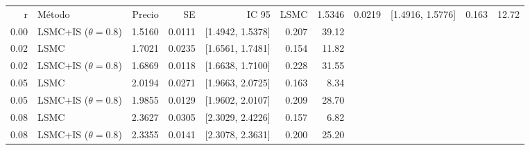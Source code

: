 \begin{tabular}{r p{3.6cm} r r r r r}
\toprule
r & Método & Precio & SE & IC 95%
 & LSMC & 1.5346 & 0.0219 & [1.4916, 1.5776] & 0.163 & 12.72 \\
0.00 & LSMC+IS ($\theta=0.8$) & 1.5160 & 0.0111 & [1.4942, 1.5378] & 0.207 & 39.12 \\
0.02 & LSMC & 1.7021 & 0.0235 & [1.6561, 1.7481] & 0.154 & 11.82 \\
0.02 & LSMC+IS ($\theta=0.8$) & 1.6869 & 0.0118 & [1.6638, 1.7100] & 0.228 & 31.55 \\
0.05 & LSMC & 2.0194 & 0.0271 & [1.9663, 2.0725] & 0.163 & 8.34 \\
0.05 & LSMC+IS ($\theta=0.8$) & 1.9855 & 0.0129 & [1.9602, 2.0107] & 0.209 & 28.70 \\
0.08 & LSMC & 2.3627 & 0.0305 & [2.3029, 2.4226] & 0.157 & 6.82 \\
0.08 & LSMC+IS ($\theta=0.8$) & 2.3355 & 0.0141 & [2.3078, 2.3631] & 0.200 & 25.20 \\
\bottomrule
\end{tabular}
